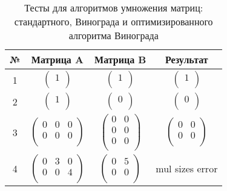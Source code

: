 \begin{table}[H]
	\begin{center}
		\caption{Тесты для алгоритмов умножения матриц: стандартного, Винограда и оптимизированного алгоритма Винограда}
		\label{table:tests}
		\begin{tabular}{|c | c | c| c |} 
			\hline
			\multicolumn{1}{|c|}{№} & \multicolumn{1}{c|}{Матрица A}
			&  \multicolumn{1}{c|}{Матрица B}
			& \multicolumn{1}{c|}{Результат} \\
			\hline
		
			
			1 & $\begin{pmatrix}
				1\\
			\end{pmatrix}$ & $\begin{pmatrix}
				1\\
			\end{pmatrix}$ & $\begin{pmatrix}
				1\\
			\end{pmatrix}$ \\ \hline
			
			2 & $\begin{pmatrix}
				1\\
			\end{pmatrix}$ & $\begin{pmatrix}
				0\\
			\end{pmatrix}$ & $\begin{pmatrix}
				0\\
			\end{pmatrix}$ \\ \hline
			
			3 & $\begin{pmatrix}
				0 & 0 & 0\\
				0 & 0 & 0\\
			\end{pmatrix}$ & $\begin{pmatrix}
				0& 0\\
				0& 0\\
				0& 0\\
			\end{pmatrix}$ &$\begin{pmatrix}
			0& 0\\
			0& 0\\
			\end{pmatrix}$ \\ \hline
			
			4 & $\begin{pmatrix}
				0 & 3 & 0\\
				0 & 0 & 4 \\
			\end{pmatrix}$ & $\begin{pmatrix}
				0& 5\\
				0& 0\\
			\end{pmatrix}$ & mul sizes error \\ \hline
			

\end{tabular}
\end{center}
\end{table}
